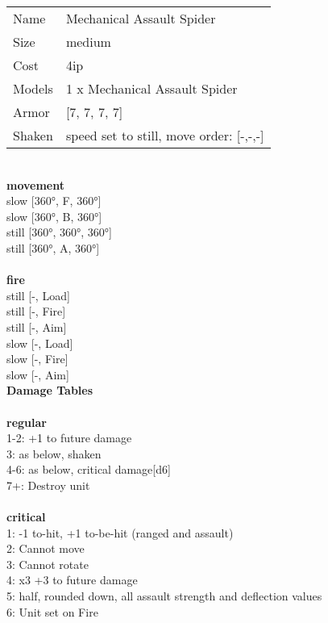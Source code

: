 \begin{tabular}{ll}
  Name & Mechanical Assault Spider \\
  Size & medium\\
  Cost & 4ip\\
  Models & 1 x Mechanical Assault Spider\\
  Armor & [7, 7, 7, 7]\\
  Shaken & speed set to still, move order: [-,-,-]\\
\end{tabular}

\noindent 

\ \\ {\bf movement } \\
slow [360°, F, 360°] \\
slow [360°, B, 360°] \\
still [360°, 360°, 360°] \\
still [360°, A, 360°] \\
\ \\ {\bf fire } \\
still [-, Load] \\
still [-, Fire] \\
still [-, Aim] \\
slow [-, Load] \\
slow [-, Fire] \\
slow [-, Aim] \\


{\bf Damage Tables} \\
\ \\ {\bf regular } \\
1-2: +1 to future damage \\
3: as below, shaken \\
4-6: as below, critical damage[d6] \\
7+: Destroy unit \\
\ \\ {\bf critical } \\
1: -1 to-hit, +1 to-be-hit (ranged and assault) \\
2: Cannot move \\
3: Cannot rotate \\
4: x3 +3 to future damage \\
5: half, rounded down, all assault strength and deflection values \\
6: Unit set on Fire \\


